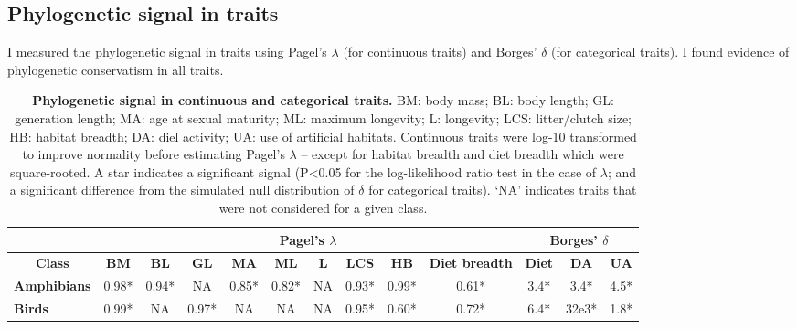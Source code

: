 \subsection{Phylogenetic signal in traits}
I measured the phylogenetic signal in traits using Pagel's $\lambda$ (for continuous traits) and Borges' $\delta$ (for categorical traits). I found evidence of phylogenetic conservatism in all traits.

\begin{table}[h!]
\renewcommand{\baselinestretch}{1}
\renewcommand{\arraystretch}{1.2}
\begin{center}\fontsize{9}{11}\selectfont
\caption[Phylogenetic signal in continuous and categorical traits]{\textbf{Phylogenetic signal in continuous and categorical traits.} BM: body mass; BL: body length; GL: generation length; MA: age at sexual maturity; ML: maximum longevity; L: longevity; LCS: litter/clutch size; HB: habitat breadth; DA: diel activity; UA: use of artificial habitats. Continuous traits were log-10 transformed to improve normality before estimating Pagel’s $\lambda$ – except for habitat breadth and diet breadth which were square-rooted. A star indicates a significant signal (P<0.05 for the log-likelihood ratio test in the case of $\lambda$; and a significant difference from the simulated null distribution of $\delta$ for categorical traits). ‘NA’ indicates traits that were not considered for a given class. %
}
\label{SI_4_Table1}  
\begin{tabular}{l|c|c|c|c|c|c|c|c|c|c|c|c|}
\cline{2-13}
                                          & \multicolumn{9}{c|}{\textbf{Pagel's $\lambda$}}                                                                       & \multicolumn{3}{c|}{\textbf{Borges' $\delta$}} \\ \hline
\multicolumn{1}{|c|}{\textbf{Class}}      & \textbf{BM} & \textbf{BL} & \textbf{GL} & \textbf{MA} & \textbf{ML} & \textbf{L} & \textbf{LCS} & \textbf{HB} & \textbf{Diet breadth} & \textbf{Diet} &  \textbf{DA} & \textbf{UA} \\ \hline
\multicolumn{1}{|l|}{\textbf{Amphibians}} & 0.98*       & 0.94*       & NA          & 0.85*       & 0.82*       & NA         & 0.93*        & 0.99*    & 0.61*  & 3.4*         &  3.4*        & 4.5*        \\ %
\multicolumn{1}{|l|}{\textbf{Birds}}      & 0.99*       & NA          & 0.97*       & NA          & NA          & NA         & 0.95*        & 0.60*   &  0.72*   & 6.4*         & 32e3*     & 1.8*        \\ %

\end{tabular}
\end{center}
\end{table}
